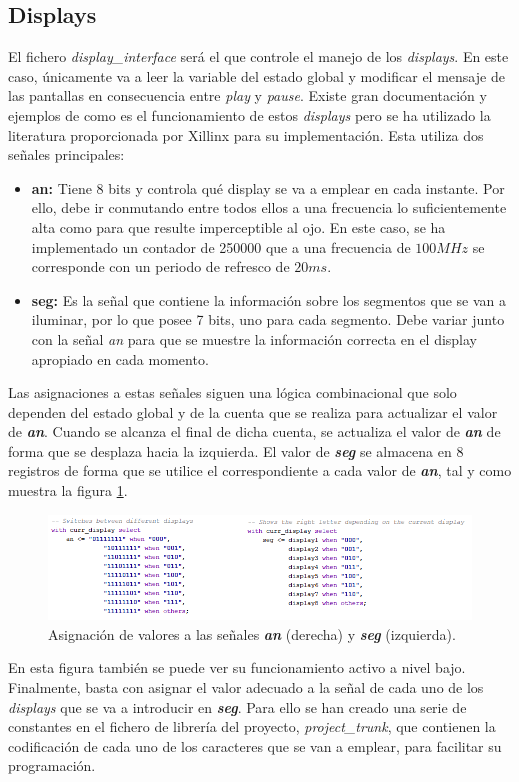 \subsection{Displays}
El fichero \emph{display\_interface} será el que controle el manejo de los \emph{displays}. En este caso, únicamente va a leer la variable del estado global y modificar el mensaje de las pantallas en consecuencia entre \emph{play} y \emph{pause}. Existe gran documentación y ejemplos de como es el funcionamiento de estos \emph{displays} pero se ha utilizado la literatura proporcionada por Xillinx \cite{Nexys} para su implementación. Esta utiliza dos señales principales:
\begin{itemize}
\item \textbf{an:} Tiene 8 bits y controla qué display se va a emplear en cada instante. Por ello, debe ir conmutando entre todos ellos a una frecuencia lo suficientemente alta como para que resulte imperceptible al ojo. En este caso, se ha implementado un contador de 250000 que a una frecuencia de $100 MHz$ se corresponde con un periodo de refresco de $20 ms$.
\item \textbf{seg:} Es la señal que contiene la información sobre los segmentos que se van a iluminar, por lo que posee 7 bits, uno para cada segmento. Debe variar junto con la señal \emph{an} para que se muestre la información correcta en el display apropiado en cada momento.
\end{itemize}

Las asignaciones a estas señales siguen una lógica combinacional que solo dependen del estado global y de la cuenta que se realiza para actualizar el valor de \textbf{\emph{an}}. Cuando se alcanza el final de dicha cuenta, se actualiza el valor de \textbf{\emph{an}} de forma que se desplaza hacia la izquierda. El valor de \textbf{\emph{seg}} se almacena en 8 registros de forma que se utilice el correspondiente a cada valor de \textbf{\emph{an}}, tal y como muestra la figura \ref{fig:seg_an}.
\begin{figure}[!ht]
\begin{center}
\includegraphics[width=16cm]{img/segan.png}
\caption{\label{fig:seg_an}Asignación de valores a las señales \textbf{\emph{an}} (derecha) y \textbf{\emph{seg}} (izquierda).}
\end{center}
\end{figure}

En esta figura también se puede ver su funcionamiento activo a nivel bajo. Finalmente, basta con asignar el valor adecuado a la señal de cada uno de los \emph{displays} que se va a introducir en \textbf{\emph{seg}}. Para ello se han creado una serie de constantes en el fichero de librería del proyecto, \emph{project\_trunk}, que contienen la codificación de cada uno de los caracteres que se van a emplear, para facilitar su programación.